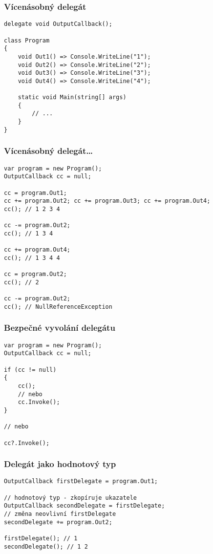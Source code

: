 \begin{frame}[fragile]
\frametitle{Vícenásobný delegát}
\begin{yesblock}
\begin{lstlisting}
delegate void OutputCallback();

class Program
{
    void Out1() => Console.WriteLine("1");
    void Out2() => Console.WriteLine("2");
    void Out3() => Console.WriteLine("3");
    void Out4() => Console.WriteLine("4");

    static void Main(string[] args)
    {
        // ...
    }
}
\end{lstlisting}
\end{yesblock}
\end{frame}




\begin{frame}[fragile]
\frametitle{Vícenásobný delegát\ldots}
\begin{yesblock}
\begin{lstlisting}
var program = new Program();
OutputCallback cc = null;

cc = program.Out1;
cc += program.Out2; cc += program.Out3; cc += program.Out4;
cc(); // 1 2 3 4

cc -= program.Out2;
cc(); // 1 3 4 

cc += program.Out4;
cc(); // 1 3 4 4

cc = program.Out2;
cc(); // 2

cc -= program.Out2;
cc(); // NullReferenceException
\end{lstlisting}
\end{yesblock}
\end{frame}




\begin{frame}[fragile]
\frametitle{Bezpečné vyvolání delegátu}
\begin{yesblock}
\begin{lstlisting}
var program = new Program();
OutputCallback cc = null;

if (cc != null)
{
    cc();
    // nebo
    cc.Invoke();
}

// nebo

cc?.Invoke();
\end{lstlisting}
\end{yesblock}
\end{frame}




\begin{frame}[fragile]
\frametitle{Delegát jako hodnotový typ}
\begin{yesblock}
\begin{lstlisting}
OutputCallback firstDelegate = program.Out1;

// hodnotový typ - zkopíruje ukazatele
OutputCallback secondDelegate = firstDelegate;
// změna neovlivní firstDelegate
secondDelegate += program.Out2;

firstDelegate(); // 1
secondDelegate(); // 1 2
\end{lstlisting}
\end{yesblock}
\end{frame}





